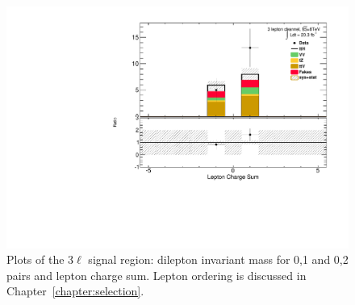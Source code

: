 \begin{figure}[!htbp]
\begin{minipage}[h]{0.5\textwidth}
  \end{minipage}\hfill
  \begin{minipage}[h]{0.5\textwidth}
    \centering \includegraphics[width=\textwidth]{figs/results/plotCand_3lep_LeptonChargeSum}
  \end{minipage}\hfill
\caption{Plots of the 3$\ell$ signal region: dilepton invariant mass for 0,1 and 0,2 pairs and lepton charge sum. Lepton ordering is discussed in Chapter~\ref{chapter:selection}.} 
\label{figure:results_3l_mass}
\end{figure} 



